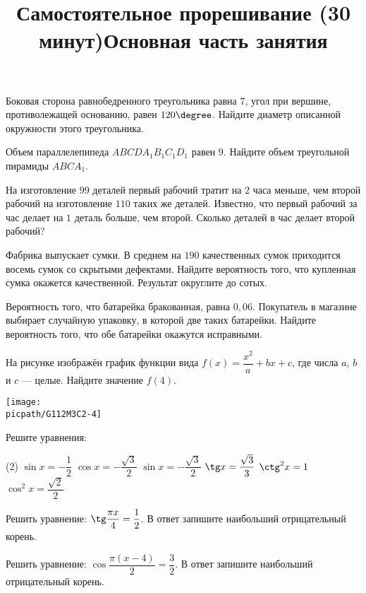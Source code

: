\begin{class}[number=4]
	\title{Самостоятельное прорешивание (30 минут)}
	\begin{listofex}
		\item Боковая сторона равнобедренного треугольника равна \( 7 \), угол при вершине, противолежащей основанию, равен \( 120\degree \). Найдите диаметр описанной окружности этого треугольника.
		\item Объем параллелепипеда \( ABCDA_1B_1C_1D_1 \) равен \( 9 \). Найдите объем треугольной пирамиды \( ABCA_1 \).
		\item На изготовление \( 99 \) деталей первый рабочий тратит на \( 2 \) часа меньше, чем второй рабочий на изготовление \( 110 \) таких же деталей. Известно, что первый рабочий за час делает на \( 1 \) деталь больше, чем второй. Сколько деталей в час делает второй рабочий?
		\item Фабрика выпускает сумки. В среднем на \( 190 \) качественных сумок приходится восемь сумок со скрытыми дефектами. Найдите вероятность того, что купленная сумка окажется качественной. Результат округлите до сотых.
		\item Вероятность того, что батарейка бракованная, равна \( 0,06 \). Покупатель в магазине выбирает случайную упаковку, в которой две таких батарейки. Найдите вероятность того, что обе батарейки окажутся исправными.
		\item На рисунке изображён график функции вида \( f(x)=\dfrac{x^2}{a}+bx+c \),  где числа \( a \), \( b \) и \( c \) --- целые. Найдите значение \( f(4) \).
		\begin{center}
			\texttt{[image: \\picpath/G112M3C2-4]}
		\end{center}
	\end{listofex}
	\newpage
	\title{Основная часть занятия}
	\begin{listofex}
		\item Решите уравнения:
		\begin{tasks}(2)
			\task \( \sin x=-\dfrac{1}{2} \)
			\task \( \cos x=-\dfrac{\sqrt{3}}{2} \)
			\task \( \sin x = -\dfrac{\sqrt{3}}{2} \)
			\task \( \tg x = \dfrac{\sqrt{3}}{3} \)
			\task \( \ctg^2 x = 1 \)
			\task \( \cos^2 x = \dfrac{\sqrt{2}}{2} \)
		\end{tasks}
		\item Решить уравнение: \( \tg\dfrac{\pi x}{4}=\dfrac{1}{2} \). В ответ запишите наибольший отрицательный корень.
		\item Решить уравнение: \( \cos\dfrac{\pi(x-4)}{2}=\dfrac{3}{2} \). В ответ запишите наибольший отрицательный корень.

\end{listofex}
\end{class}
